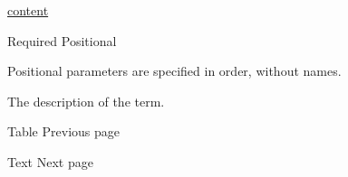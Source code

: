 \href{/docs/reference/foundations/content/}{content}

{Required} {{ Positional }}

\label{definitions-item-description-positional-tooltip}
Positional parameters are specified in order, without names.

The description of the term.

\href{/docs/reference/model/table/}{\pandocbounded{}}

{ Table } { Previous page }

\href{/docs/reference/text/}{\pandocbounded{}}

{ Text } { Next page }
